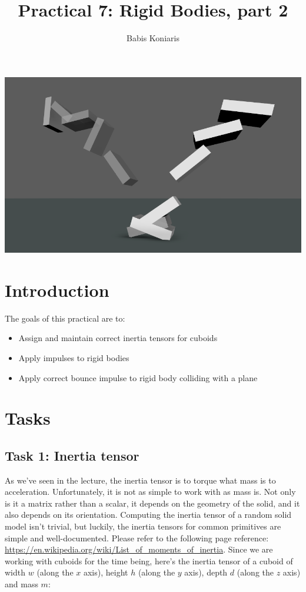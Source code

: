 \documentclass[12pt]{article}
\title{\textbf{Practical 7: Rigid Bodies, part 2 }}
\author{Babis Koniaris}
\date{}
\begin{document}
\maketitle

\begin{center}
\includegraphics[width=\textwidth]{p7-teaser.png}
\end{center}
\pagebreak

\section*{Introduction}

The goals of this practical are to:

\begin{itemize}
\item Assign and maintain correct inertia tensors for cuboids
\item Apply impulses to rigid bodies
\item Apply correct bounce impulse to rigid body colliding with a plane
\end{itemize}

\section*{Tasks}

\subsection*{Task 1: Inertia tensor}

As we’ve seen in the lecture, the inertia tensor is to torque what mass is to acceleration. Unfortunately, it is not as simple to work with as mass is. Not only is it a matrix rather than a scalar, it depends on the geometry of the solid, and it also depends on its orientation. Computing the inertia tensor of a random solid model isn’t trivial, but luckily, the inertia tensors for common primitives are simple and well-documented. Please refer to the following page reference: \url{https://en.wikipedia.org/wiki/List_of_moments_of_inertia}. Since we are working with cuboids for the time being, here’s the inertia tensor of a cuboid of width $w$ (along the $x$ axis), height $h$ (along the $y$ axis), depth $d$ (along the $z$ axis) and mass $m$:
\end{document}
